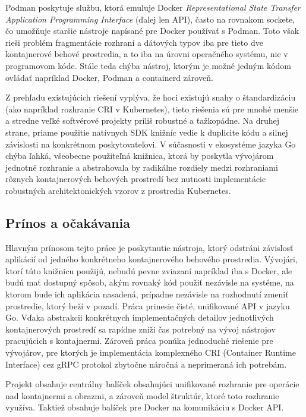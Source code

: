 \documentclass[
 program=infpvs,
  language=slovak,
  figures=false,
  tables=false,
  sourcecodes,
  glossaries,
  index
]{kidiplom}
\begin{document}
Podman poskytuje službu, ktorá emuluje Docker \textit{Representational State Transfer Application Programming Interface} (ďalej len API), často na rovnakom sockete, čo umožňuje staršie nástroje napísané pre Docker používať s Podman. Toto však rieši problém fragmentácie rozhraní a dátových typov iba pre tieto dve kontajnerové behové prostredia, a to iba na úrovni operačného systému, nie v programovom kóde. Stále teda chýba nástroj, ktorým je možné jedným kódom ovládať napríklad Docker, Podman a containerd zároveň.

Z prehľadu existujúcich riešení vyplýva, že hoci existujú snahy o štandardizáciu (ako napríklad rozhranie CRI v Kubernetes), tieto riešenia sú pre mnohé menšie a stredne veľké softvérové projekty príliš robustné a ťažkopádne. Na druhej strane, priame použitie natívnych SDK knižníc vedie k duplicite kódu a silnej závislosti na konkrétnom poskytovateľovi. V súčasnosti v ekosystéme jazyka Go chýba ľahká, všeobecne použiteľná knižnica, ktorá by poskytla vývojárom jednotné rozhranie a abstrahovala by radikálne rozdiely medzi rozhraniami rôznych kontajnerových behových prostredí bez nutnosti implementácie robustných architektonických vzorov z prostredia Kubernetes.

\subsection{Prínos a očakávania}  \label{sec:prinos}
Hlavným prínosom tejto práce je poskytnutie nástroja, ktorý odstráni závislosť aplikácií od jedného konkrétneho kontajnerového behového prostredia. Vývojári, ktorí túto knižnicu použijú, nebudú pevne zviazaní napríklad iba s Docker, ale budú mať dostupný spôsob, akým rovnaký kód použiť nezávisle na systéme, na ktorom bude ich aplikácia nasadená, prípadne nezávisle na rozhodnutí zmeniť prostredie, ktorý beží v pozadí. Práca prinesie čisté, unifikované API v jazyku Go. Vďaka abstrakcii konkrétnych implementačných detailov jednotlivých kontajnerových prostredí sa rapídne zníži čas potrebný na vývoj nástrojov pracujúcich s kontajnermi. Zároveň práca ponúka jednoduché riešenie pre vývojárov, pre ktorých je implementácia komplexného CRI (Container Runtime Interface) cez gRPC protokol zbytočne náročná a neprimeraná ich potrebám.

Projekt obsahuje centrálny balíček obsahujúci unifikované rozhranie pre operácie nad kontajnermi a obrazmi, a zároveň model štruktúr, ktoré toto rozhranie využíva. Taktiež obsahuje balíček pre Docker na komunikáciu s Docker API.
\end{document}
